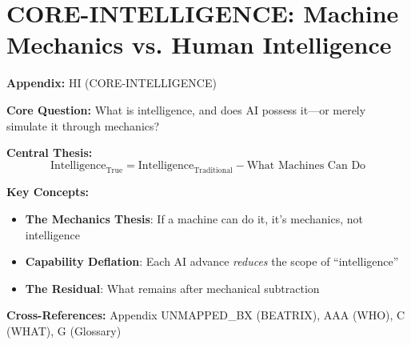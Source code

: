 \chapter{CORE-INTELLIGENCE: Machine Mechanics vs. Human Intelligence}
\label{app:core-intelligence}


\begin{tcolorbox}[colback=blue!5!white, colframe=blue!75!black,
    title=Quick Reference: Appendix UNMAPPED_HI]

\textbf{Appendix:} HI (CORE-INTELLIGENCE)

\textbf{Core Question:} What is intelligence, and does AI possess it---or merely simulate it through mechanics?

\textbf{Central Thesis:}
\begin{equation}
\text{Intelligence}_{\text{True}} = \text{Intelligence}_{\text{Traditional}} - \text{What Machines Can Do}
\label{eq:hi-core}
\end{equation}

\textbf{Key Concepts:}
\begin{itemize}[nosep]
\item \textbf{The Mechanics Thesis}: If a machine can do it, it's mechanics, not intelligence
\item \textbf{Capability Deflation}: Each AI advance \textit{reduces} the scope of ``intelligence''
\item \textbf{The Residual}: What remains after mechanical subtraction
\end{itemize}

\textbf{Cross-References:} Appendix UNMAPPED_BX (BEATRIX), AAA (WHO), C (WHAT), G (Glossary)
\end{tcolorbox}


\begin{abstract}
This appendix develops the \textbf{Mechanics Thesis}: the claim that what machines can demonstrably perform is, by definition, not intelligence but mechanics. We begin with traditional definitions of intelligence (Turing, Gardner, Spearman) and systematically subtract what Large Language Models and other AI systems can now perform. The residual---what remains after this subtraction---represents \textit{true} intelligence. This analysis has profound implications for how we understand human cognition, the limits of AI, and the role of BEATRIX as a \textit{mechanical amplifier} of human intelligence rather than a replacement for it.
\end{abstract}


